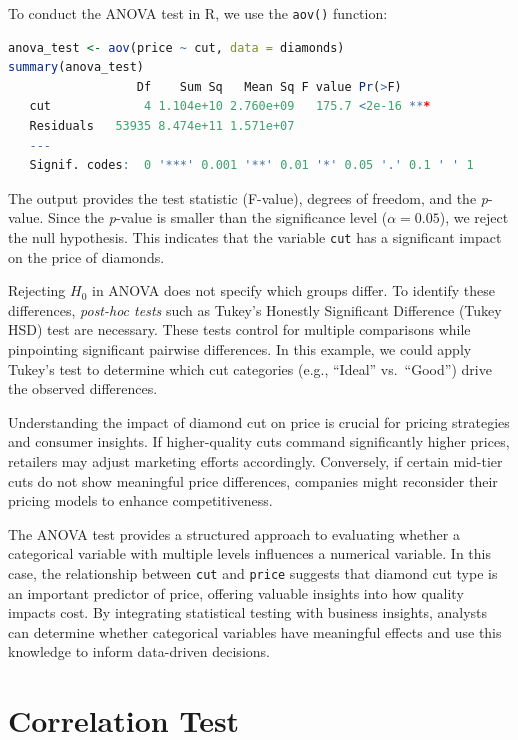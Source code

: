 \documentclass[
]{book}
\newcommand{\passthrough}[1]{#1}
\theoremstyle{definition}
\theoremstyle{definition}
\theoremstyle{definition}
\theoremstyle{definition}
\theoremstyle{remark}
\begin{document}
To conduct the ANOVA test in R, we use the \passthrough{\lstinline!aov()!} function:

\begin{lstlisting}[language=R]
anova_test <- aov(price ~ cut, data = diamonds)
summary(anova_test)
                  Df    Sum Sq   Mean Sq F value Pr(>F)    
   cut             4 1.104e+10 2.760e+09   175.7 <2e-16 ***
   Residuals   53935 8.474e+11 1.571e+07                   
   ---
   Signif. codes:  0 '***' 0.001 '**' 0.01 '*' 0.05 '.' 0.1 ' ' 1
\end{lstlisting}

The output provides the test statistic (F-value), degrees of freedom, and the \emph{p}-value. Since the \emph{p}-value is smaller than the significance level (\(\alpha = 0.05\)), we reject the null hypothesis. This indicates that the variable \passthrough{\lstinline!cut!} has a significant impact on the price of diamonds.

Rejecting \(H_0\) in ANOVA does not specify which groups differ. To identify these differences, \emph{post-hoc tests} such as Tukey's Honestly Significant Difference (Tukey HSD) test are necessary. These tests control for multiple comparisons while pinpointing significant pairwise differences. In this example, we could apply Tukey's test to determine which cut categories (e.g., ``Ideal'' vs.~``Good'') drive the observed differences.

Understanding the impact of diamond cut on price is crucial for pricing strategies and consumer insights. If higher-quality cuts command significantly higher prices, retailers may adjust marketing efforts accordingly. Conversely, if certain mid-tier cuts do not show meaningful price differences, companies might reconsider their pricing models to enhance competitiveness.

The ANOVA test provides a structured approach to evaluating whether a categorical variable with multiple levels influences a numerical variable. In this case, the relationship between \passthrough{\lstinline!cut!} and \passthrough{\lstinline!price!} suggests that diamond cut type is an important predictor of price, offering valuable insights into how quality impacts cost. By integrating statistical testing with business insights, analysts can determine whether categorical variables have meaningful effects and use this knowledge to inform data-driven decisions.

\section{Correlation Test}\label{correlation-test}
\end{document}
